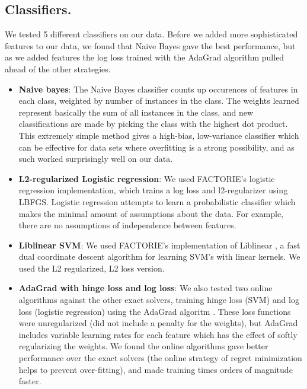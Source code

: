 \documentclass[11pt]{article}
\begin{document}
\subsection*{Classifiers.}We tested 5 different classifiers on our data. Before we added more sophisticated features to our data, we found that Naive Bayes gave the best performance, but as we added features the log loss trained with the AdaGrad algorithm pulled ahead of the other strategies.
 \begin{itemize}
\item \textbf{Naive bayes}: The Naive Bayes classifier counts up occurences of features in each class, weighted by number of instances in the class. The weights learned represent basically the sum of all instances in the class, and new classifications are made by picking the class with the highest dot product. This extremely simple method gives a high-bias, low-variance classifier which can be effective for data sets where overfitting is a strong possibility, and as such worked surprisingly well on our data.
\item \textbf{L2-regularized Logistic regression}: We used FACTORIE's logistic regression implementation, which trains a log loss and l2-regularizer using LBFGS. Logistic regression attempts to learn a probabilistic classifier which makes the minimal amount of assumptions about the data. For example, there are no assumptions of independence between features.
\item \textbf{Liblinear SVM}: We used FACTORIE's implementation of Liblinear \cite{chang:08a}, a fast dual coordinate descent algorithm for learning SVM's with linear kernels. We used the L2 regularized, L2 loss version.
\item \textbf{AdaGrad with hinge loss and log loss}: We also tested two online algorithms against the other exact solvers, training hinge loss (SVM) and log loss (logistic regression) using the AdaGrad algoritm \cite{duchi:11a}. These loss functions were unregularized (did not include a penalty for the weights), but AdaGrad includes variable learning rates for each feature which has the effect of softly regularizing the weights. We found the online algorithms gave better performance over the exact solvers (the online strategy of regret minimization helps to prevent over-fitting), and made training times orders of magnitude faster.
\end{itemize}
\end{document}
